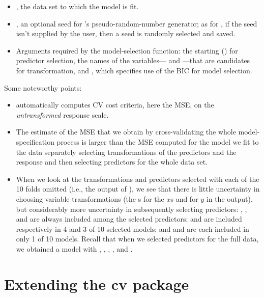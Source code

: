 \documentclass[
]{jss}
\providecommand{\tightlist}{%
  \setlength{\itemsep}{0pt}\setlength{\parskip}{0pt}}
\begin{document}
\begin{itemize}
\tightlist
\item
  , the data set to which the model is fit.
\item
  , an optional seed for 's pseudo-random-number
  generator; as for , if the seed isn't supplied by the user,
  then a seed is randomly selected and saved.
\item
  Arguments required by the model-selection function: the starting
   () for predictor selection, the names of the
  variables--- and ---that are
  candidates for transformation, and , which specifies
  use of the BIC for model selection.
\end{itemize}

Some noteworthy points:

\begin{itemize}
\tightlist
\item
   automatically computes CV cost criteria,
  here the MSE, on the \emph{untransformed} response scale.
\item
  The estimate of the MSE that we obtain by cross-validating the whole
  model-specification process is larger than the MSE computed for the
  model we fit to the  data separately selecting
  transformations of the predictors and the response and then selecting
  predictors for the whole data set.
\item
  When we look at the transformations and predictors selected with each
  of the 10 folds omitted (i.e., the output of ),
  we see that there is little uncertainty in choosing variable
  transformations (the s for the \(x\)s and 
  for \(y\) in the output), but considerably more uncertainty in
  subsequently selecting predictors: , ,
  and  are always included among the selected predictors;
   and  are included respectively
  in 4 and 3 of 10 selected models; and  and
   are each included in only 1 of 10 models. Recall that
  when we selected predictors for the full data, we obtained a model
  with , , ,
  , and .
\end{itemize}

\hypertarget{extending-the-cv-package}{%
\section{Extending the cv package}\label{extending-the-cv-package}}
\end{document}
